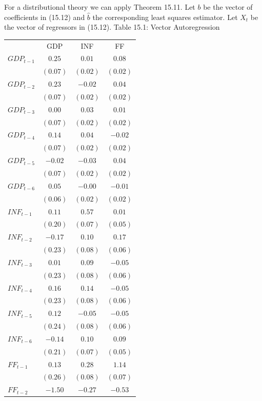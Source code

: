 \documentclass[10pt]{article}
\begin{document}
For a distributional theory we can apply Theorem 15.11. Let $b$ be the vector of coefficients in (15.12) and $\widehat{b}$ the corresponding least squares estimator. Let $X_{t}$ be the vector of regressors in (15.12). Table 15.1: Vector Autoregression

\begin{tabular}{lccc}
\hline\hline
 & GDP & INF & FF \\
\cline { 2 - 4 }
$G D P_{t-1}$ & $0.25$ & $0.01$ & $0.08$ \\
 & $(0.07)$ & $(0.02)$ & $(0.02)$ \\
$G D P_{t-2}$ & $0.23$ & $-0.02$ & $0.04$ \\
 & $(0.07)$ & $(0.02)$ & $(0.02)$ \\
$G D P_{t-3}$ & $0.00$ & $0.03$ & $0.01$ \\
 & $(0.07)$ & $(0.02)$ & $(0.02)$ \\
$G D P_{t-4}$ & $0.14$ & $0.04$ & $-0.02$ \\
 & $(0.07)$ & $(0.02)$ & $(0.02)$ \\
$G D P_{t-5}$ & $-0.02$ & $-0.03$ & $0.04$ \\
 & $(0.07)$ & $(0.02)$ & $(0.02)$ \\
$G D P_{t-6}$ & $0.05$ & $-0.00$ & $-0.01$ \\
 & $(0.06)$ & $(0.02)$ & $(0.02)$ \\
$I N F_{t-1}$ & $0.11$ & $0.57$ & $0.01$ \\
 & $(0.20)$ & $(0.07)$ & $(0.05)$ \\
$I N F_{t-2}$ & $-0.17$ & $0.10$ & $0.17$ \\
 & $(0.23)$ & $(0.08)$ & $(0.06)$ \\
$I N F_{t-3}$ & $0.01$ & $0.09$ & $-0.05$ \\
 & $(0.23)$ & $(0.08)$ & $(0.06)$ \\
$I N F_{t-4}$ & $0.16$ & $0.14$ & $-0.05$ \\
 & $(0.23)$ & $(0.08)$ & $(0.06)$ \\
$I N F_{t-5}$ & $0.12$ & $-0.05$ & $-0.05$ \\
 & $(0.24)$ & $(0.08)$ & $(0.06)$ \\
$I N F_{t-6}$ & $-0.14$ & $0.10$ & $0.09$ \\
 & $(0.21)$ & $(0.07)$ & $(0.05)$ \\
$F F_{t-1}$ & $0.13$ & $0.28$ & $1.14$ \\
 & $(0.26)$ & $(0.08)$ & $(0.07)$ \\
$F F_{t-2}$ & $-1.50$ & $-0.27$ & $-0.53$ \\

\end{tabular}
\end{document}
